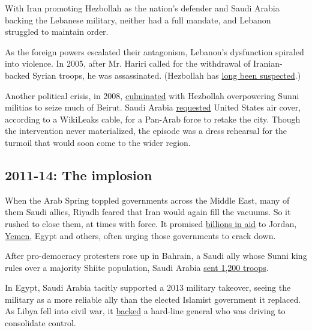 With Iran promoting Hezbollah as the nation's defender and Saudi Arabia
backing the Lebanese military, neither had a full mandate, and Lebanon
struggled to maintain order.

As the foreign powers escalated their antagonism, Lebanon's dysfunction
spiraled into violence. In 2005, after Mr. Hariri called for the
withdrawal of Iranian-backed Syrian troops, he was assassinated.
(Hezbollah has
\href{http://www.nytimes.com/2015/02/15/magazine/the-hezbollah-connection.html}{long
been suspected}.)

Another political crisis, in 2008,
\href{http://www.nytimes.com/2008/05/10/world/middleeast/10lebanon.html}{culminated}
with Hezbollah overpowering Sunni militias to seize much of Beirut.
Saudi Arabia
\href{https://www.theguardian.com/world/2010/dec/07/wikileaks-saudi-arab-invasion-lebanon}{requested}
United States air cover, according to a WikiLeaks cable, for a Pan-Arab
force to retake the city. Though the intervention never materialized,
the episode was a dress rehearsal for the turmoil that would soon come
to the wider region.

\hypertarget{2011-14-the-implosion}{%
\subsection{2011-14: The implosion}\label{2011-14-the-implosion}}

When the Arab Spring toppled governments across the Middle East, many of
them Saudi allies, Riyadh feared that Iran would again fill the vacuums.
So it rushed to close them, at times with force. It promised
\href{https://english.alarabiya.net/articles/2012/09/19/239028.html}{billions
in aid} to Jordan,
\href{http://www.ft.com/cms/s/0/85c1ba8c-a4df-11e1-9908-00144feabdc0.html\#axzz3buob0jrp}{Yemen},
Egypt and others, often urging those governments to crack down.

After pro-democracy protesters rose up in Bahrain, a Saudi ally whose
Sunni king rules over a majority Shiite population, Saudi Arabia
\href{http://www.nytimes.com/2011/03/15/world/middleeast/15bahrain.html}{sent
1,200 troops}.

In Egypt, Saudi Arabia tacitly supported a 2013 military takeover,
seeing the military as a more reliable ally than the elected Islamist
government it replaced. As Libya fell into civil war, it
\href{http://www.nytimes.com/2014/10/16/world/middleeast/general-escalates-libya-attack-.html}{backed}
a hard-line general who was driving to consolidate control.

